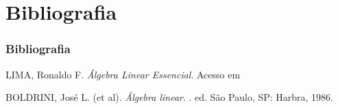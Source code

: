 \section{Bibliografia}


\begin{frame}
    \frametitle{Bibliografia}

    \begin{thebibliography}{99}
        LIMA, Ronaldo F.
        \newblock \emph{Álgebra Linear Essencial}.
        \newblock Acesso em 


       BOLDRINI, José L. (et al). 
        \newblock \emph{Álgebra linear}.
        . ed. São Paulo, SP: Harbra, 1986.
    \end{thebibliography}
\end{frame}
